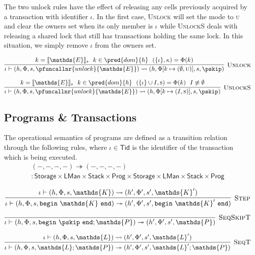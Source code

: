 The two unlock rules have the effect of releasing any cells previously acquired by a transaction with identifier $\iota$. In the first case, \textsc{Unlock} will set the mode to \textsc{u} and clear the owners set when its only member is $\iota$ while \textsc{UnlockS} deals with releasing a shared lock that still has transactions holding the same lock. In this situation, we simply remove $\iota$ from the owners set.

\[
\infer[\textsc{Unlock}]
{
	\iota \vdash (h, \Phi, s, \pfuncallnr{unlock}{\mathds{E}})
	\rightsquigarrow
	(h, \Phi[k \mapsto (\emptyset, \textsc{u})], s, \pskip)
}
{
	k = \llbracket \mathds{E} \rrbracket_s\ \
	k \in \pred{dom}{h}\ \
	(\{\iota\}, \kappa) = \Phi(k)
}
\]

\[
\infer[\textsc{UnlockS}]
{
	\iota \vdash (h, \Phi, s, \pfuncallnr{unlock}{\mathds{E}})
	\rightsquigarrow
	(h, \Phi[k \mapsto (I, \textsc{s})], s, \pskip)
}
{
	k = \llbracket \mathds{E} \rrbracket_s\ \
	k \in \pred{dom}{h}\ \
	(\{\iota\} \cup I, \textsc{s}) = \Phi(k)\ \
	I \not\equiv \emptyset
}
\]

\subsection{Programs \& Transactions}
The operational semantics of programs are defined as a transition relation through the following rules, where $\iota \in \mathsf{Tid}$ is the identifier of the transaction which is being executed.
\begin{gather*}
(-, -, -, -) \twoheadrightarrow (-, -, -, -) \\: \mathsf{Storage} \times \mathsf{LMan} \times \mathsf{Stack} \times \mathsf{Prog} \times \mathsf{Storage} \times \mathsf{LMan} \times \mathsf{Stack} \times \mathsf{Prog}
\end{gather*}

\[
\infer[\textsc{Step}]
{
	\iota \vdash (h, \Phi, s, \mathtt{begin}\ \mathds{K}\ \mathtt{end})
	\twoheadrightarrow
	(h', \Phi', s', \mathtt{begin}\ \mathds{K}'\ \mathtt{end})
}
{
	\iota \vdash (h, \Phi, s, \mathds{K})
	\rightsquigarrow
	(h', \Phi', s', \mathds{K}')
}
\]

\[
\infer[\textsc{SeqSkipT}]
{
	\iota \vdash (h, \Phi, s, \mathtt{begin}\ \pskip\ \mathtt{end}; \mathds{P})
	\twoheadrightarrow
	(h', \Phi', s', \mathds{P})
}
{}
\]

\[
\infer[\textsc{SeqT}]
{
	\iota \vdash (h, \Phi, s, \mathds{L}; \mathds{P})
	\twoheadrightarrow
	(h', \Phi', s', \mathds{L}'; \mathds{P})
}
{
	\iota \vdash (h, \Phi, s, \mathds{L})
	\rightsquigarrow
	(h', \Phi', s', \mathds{L}')
}
\]

